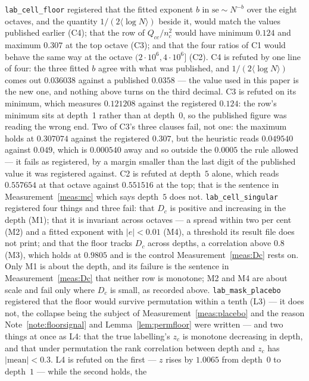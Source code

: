 \documentclass[11pt,a4paper]{article}
\theoremstyle{plain}
\theoremstyle{definition}
\theoremstyle{remark}
\begin{document}
\texttt{lab\_cell\_floor} registered that the fitted exponent $b$ in
$\mathrm{se}\sim N^{-b}$ over the eight octaves, and the quantity
$1/(2\langle\log N\rangle)$ beside it, would match the values published
earlier (C4); that the row of $Q_{cc}/n_c^2$ would have minimum
$0.124$ and maximum $0.307$ at the top octave (C3); and that the four
ratios of C1 would behave the same way at the octave
$(2\cdot10^6,4\cdot10^6]$ (C2). C4 is refuted by one line of four: the
three fitted $b$ agree with what was published, and
$1/(2\langle\log N\rangle)$ comes out $0.036038$ against a published
$0.0358$ --- the value used in this paper is the new one, and nothing
above turns on the third decimal. C3 is refuted on its minimum, which
measures $0.121208$ against the registered $0.124$: the row's minimum
sits at depth~1 rather than at depth~0, so the published figure was
reading the wrong end. Two of C3's three clauses fail, not one: the
maximum holds at $0.307074$ against the registered $0.307$, but the
heuristic reads $0.049540$ against $0.049$, which is $0.000540$ away
and so outside the $0.0005$ the rule allowed --- it fails as
registered, by a margin smaller than the last digit of the published
value it was registered against. C2 is
refuted at depth~$5$ alone, which reads $0.557654$ at that octave
against $0.551516$ at the top; that is the sentence in
Measurement~\ref{meas:mc} which says depth~$5$ does not.
\texttt{lab\_cell\_singular}
registered four things and three fail: that $D_c$ is positive and
increasing in the depth (M1); that it is invariant across octaves ---
a spread within two per cent (M2) and a fitted exponent with
$|e|<0.01$ (M4), a threshold its result file does not print; and that
the floor tracks $D_c$ across depths, a correlation above $0.8$ (M3),
which holds at $0.9805$ and is the control
Measurement~\ref{meas:Dc} rests on. Only M1 is about the depth, and its failure is the
sentence in Measurement~\ref{meas:Dc} that neither row is monotone;
M2 and M4 are about scale and fail only where $D_c$ is small, as
recorded above.
\texttt{lab\_mask\_placebo} registered that the floor would survive
permutation within a tenth (L3) --- it does not, the collapse being
the subject of Measurement~\ref{meas:placebo} and the reason
Note~\ref{note:floorsignal} and Lemma~\ref{lem:permfloor} were
written --- and two things at once as L4: that
the true labelling's $z_c$ is monotone decreasing in depth, and that
under permutation the rank correlation between depth and $z_c$ has
$|\mathrm{mean}|<0.3$. L4 is refuted on the first --- $z$ rises by
$1.0065$ from depth~$0$ to depth~$1$ --- while the second holds, the
\end{document}

